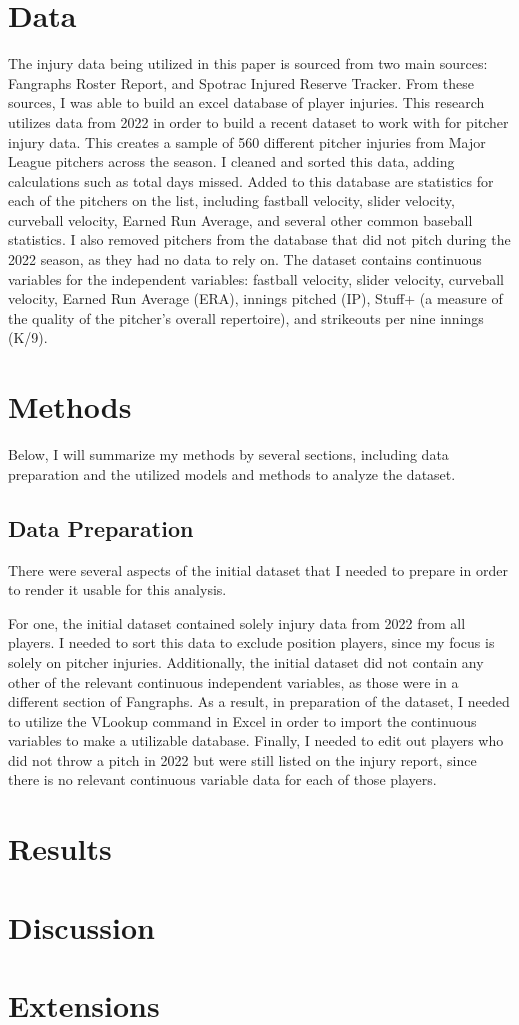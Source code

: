 \documentclass{article}
\begin{document}
\section{Data}
The injury data being utilized in this paper is sourced from two main sources: Fangraphs Roster Report, and Spotrac Injured Reserve Tracker. From these sources, I was able to build an excel database of player injuries. This research utilizes data from 2022 in order to build a recent dataset to work with for pitcher injury data. This creates a sample of 560 different pitcher injuries from Major League pitchers across the season. I cleaned and sorted this data, adding calculations such as total days missed. Added to this database are statistics for each of the pitchers on the list, including fastball velocity, slider velocity, curveball velocity, Earned Run Average, and several other common baseball statistics. I also removed pitchers from the database that did not pitch during the 2022 season, as they had no data to rely on. The dataset contains continuous variables for the independent variables: fastball velocity, slider velocity, curveball velocity, Earned Run Average (ERA), innings pitched (IP), Stuff+ (a measure of the quality of the pitcher's overall repertoire), and strikeouts per nine innings (K/9). 

\section{Methods}

Below, I will summarize my methods by several sections, including data preparation and the utilized models and methods to analyze the dataset.

\subsection{Data Preparation}

There were several aspects of the initial dataset that I needed to prepare in order to render it usable for this analysis. 

For one, the initial dataset contained solely injury data from 2022 from all players. I needed to sort this data to exclude position players, since my focus is solely on pitcher injuries. Additionally, the initial dataset did not contain any other of the relevant continuous independent variables, as those were in a different section of Fangraphs. As a result, in preparation of the dataset, I needed to utilize the VLookup command in Excel in order to import the continuous variables to make a utilizable database. Finally, I needed to edit out players who did not throw a pitch in 2022 but were still listed on the injury report, since there is no relevant continuous variable data for each of those players. 

\section{Results}

\section{Discussion}

\section{Extensions}
\end{document}
